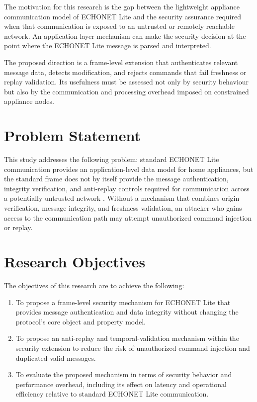 The motivation for this research is the gap between the lightweight appliance communication model of ECHONET Lite and the security assurance required when that communication is exposed to an untrusted or remotely reachable network. An application-layer mechanism can make the security decision at the point where the ECHONET Lite message is parsed and interpreted.

The proposed direction is a frame-level extension that authenticates relevant message data, detects modification, and rejects commands that fail freshness or replay validation. Its usefulness must be assessed not only by security behaviour but also by the communication and processing overhead imposed on constrained appliance nodes.

\section{Problem Statement}

This study addresses the following problem: standard ECHONET Lite communication provides an application-level data model for home appliances, but the standard frame does not by itself provide the message authentication, integrity verification, and anti-replay controls required for communication across a potentially untrusted network \citep{echonet_lite_part2}. Without a mechanism that combines origin verification, message integrity, and freshness validation, an attacker who gains access to the communication path may attempt unauthorized command injection or replay.

\section{Research Objectives}

The objectives of this research are to achieve the following:
\begin{enumerate}[nosep]
  \item To propose a frame-level security mechanism for ECHONET Lite that provides message authentication and data integrity without changing the protocol's core object and property model.
  \item To propose an anti-replay and temporal-validation mechanism within the security extension to reduce the risk of unauthorized command injection and duplicated valid messages.
  \item To evaluate the proposed mechanism in terms of security behavior and performance overhead, including its effect on latency and operational efficiency relative to standard ECHONET Lite communication.
\end{enumerate}



